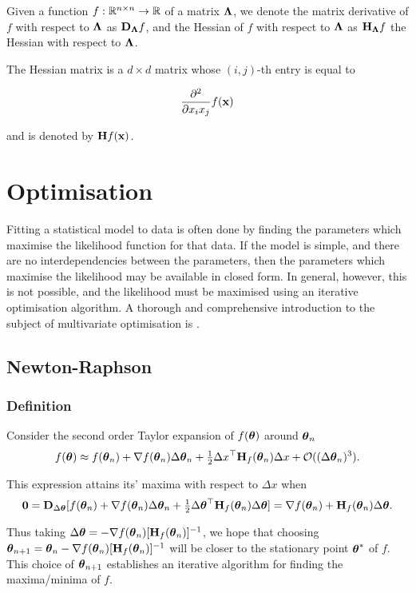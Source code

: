 \documentclass{amsart}[12pt]
\begin{document}
Given a function $f:{\mathbb{R}}^{n \times n} \to {\mathbb{R}}$ of a matrix ${\boldsymbol \Lambda}$, we denote the matrix derivative of $f$ with 
respect to ${\boldsymbol \Lambda}$ as ${\bf D}_{\boldsymbol \Lambda} f$, and the Hessian of $f$ with respect to ${\boldsymbol \Lambda}$ as
${\bf H}_{\boldsymbol \Lambda} f$ the Hessian with respect to ${\boldsymbol \Lambda}$.

The Hessian matrix is a $d \times d$ matrix whose $(i, j)$-th entry is equal to

\[
	\frac{\partial^2}{\partial x_i x_j} f({\bf x})
\]

and is denoted by ${\bf H} f({\bf x})$.

\section{Optimisation}
Fitting a statistical model to data is often done by finding the parameters which maximise the likelihood
function for that data. If the model is simple, and there are no interdependencies between the parameters,
then the parameters which maximise the likelihood may be available in closed form. In general, however, this
is not possible, and the likelihood must be maximised using an iterative optimisation algorithm. A thorough 
and comprehensive introduction to the subject of multivariate optimisation is \cite{Nocedal2006}.

\subsection{Newton-Raphson}

\subsubsection{Definition}

Consider the second order Taylor expansion of $f({\boldsymbol \theta})$ around ${\boldsymbol \theta}_{n}$
\[
	f({\boldsymbol \theta}) \approx f({\boldsymbol \theta}_{n}) + \nabla f({\boldsymbol \theta}_{n}) \Delta {\boldsymbol\theta}_{n} + \tfrac{1}{2} \Delta x^\top {\bf H}_f({\boldsymbol \theta}_{n}) \Delta x + {\mathcal O}((\Delta {\boldsymbol\theta}_{n})^3).
\]

This expression attains its' maxima with respect to $\Delta x$ when
\[
	{\bf 0} = {\bf D}_{\Delta {\boldsymbol\theta}} [f({\boldsymbol \theta}_{n}) + \nabla f({\boldsymbol \theta}_{n}) \Delta {\boldsymbol\theta}_{n} + \tfrac{1}{2} \Delta {\boldsymbol\theta}^\top {\bf H}_f({\boldsymbol \theta}_{n}) \Delta {\boldsymbol\theta}] = \nabla f({\boldsymbol \theta}_n) + {\bf H}_f({\boldsymbol \theta}_n) \Delta {\boldsymbol\theta}.
\]

Thus taking $\Delta {\boldsymbol\theta} = -\nabla f({\boldsymbol \theta}_n) [{\bf H}_f({\boldsymbol \theta}_n)]^{-1}$, we hope that choosing
${\boldsymbol \theta}_{n + 1} = {\boldsymbol \theta}_{n} - \nabla f({\boldsymbol \theta}_n) [{\bf H}_f({\boldsymbol \theta}_n)]^{-1}$ will be closer to the stationary 
point ${\boldsymbol \theta}^*$ of $f$. This choice of ${\boldsymbol \theta}_{n+1}$ establishes an iterative algorithm for finding the 
maxima/minima of $f$.
\end{document}
